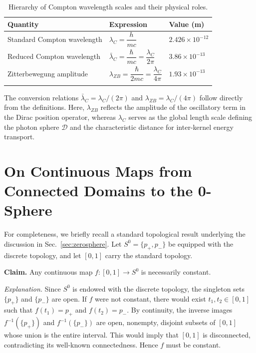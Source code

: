 \documentclass[%
 reprint,
 amsmath,amssymb,
 aps,
 prb,
]{revtex4-2}
\numberwithin{equation}{section}
\begin{document}
\begin{table}[t!]
\centering
\caption{Hierarchy of Compton wavelength scales and their physical roles.}
\label{tab:compton_wavelength_hierarchy}
\renewcommand{\arraystretch}{1.4}
\begin{tabular}{p{6.0cm}p{6.0cm}p{5.0cm}}
\toprule
\textbf{Quantity} & \textbf{Expression} & \textbf{Value (m)} \\
\midrule
Standard Compton wavelength
& $\lambda_C = \dfrac{h}{mc}$
& $2.426 \times 10^{-12}$ \\
\addlinespace[0.25cm]

Reduced Compton wavelength
& $\bar{\lambda}_C = \dfrac{\hbar}{mc} = \dfrac{\lambda_C}{2\pi}$
& $3.86 \times 10^{-13}$ \\
\addlinespace[0.25cm]

Zitterbewegung amplitude
& $\lambda_{ZB} = \dfrac{\hbar}{2mc} = \dfrac{\lambda_C}{4\pi}$
& $1.93 \times 10^{-13}$ \\
\addlinespace[0.20cm]
\bottomrule
\end{tabular}

\vspace{0.4em}
\begin{minipage}{0.95\textwidth}
\justifying\small
The conversion relations $\bar{\lambda}_C = \lambda_C/(2\pi)$ and
$\lambda_{ZB} = \lambda_C/(4\pi)$ follow directly from the definitions.
Here, $\lambda_{ZB}$ reflects the amplitude of the oscillatory term in the Dirac position operator,
whereas $\lambda_C$ serves as the global length scale defining the photon sphere $\mathcal{D}$
and the characteristic distance for inter-kernel energy transport.
\end{minipage}
\end{table}


\section{On Continuous Maps from Connected Domains to the 0-Sphere}
\label{sec:appendix_continuous}

For completeness, we briefly recall a standard topological result underlying the discussion in Sec.~\ref{sec:zerosphere}.
Let $S^{0}=\{p_{+},p_{-}\}$ be equipped with the discrete topology, and let $[0,1]$ carry the standard topology.

\medskip
\noindent\textbf{Claim.}
Any continuous map $f:[0,1]\to S^{0}$ is necessarily constant.

\medskip
\noindent\textit{Explanation.}
Since $S^{0}$ is endowed with the discrete topology, the singleton sets $\{p_{+}\}$ and $\{p_{-}\}$ are open.
If $f$ were not constant, there would exist $t_{1},t_{2}\in[0,1]$ such that
$f(t_{1})=p_{+}$ and $f(t_{2})=p_{-}$.
By continuity, the inverse images $f^{-1}(\{p_{+}\})$ and $f^{-1}(\{p_{-}\})$ are open, nonempty, disjoint subsets of $[0,1]$ whose union is the entire interval.
This would imply that $[0,1]$ is disconnected, contradicting its well-known connectedness.
Hence $f$ must be constant.
\end{document}
